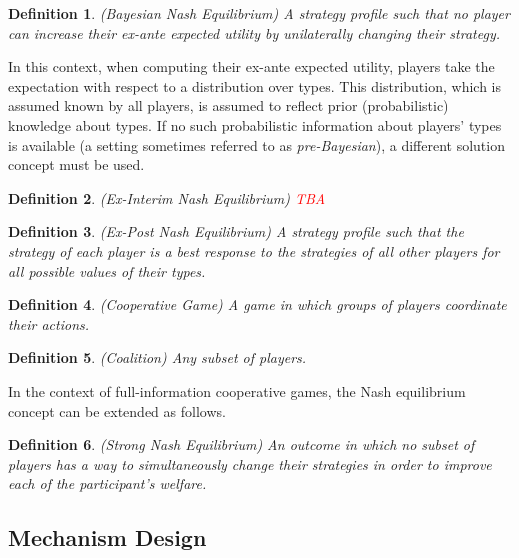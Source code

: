 \documentclass{article}
\newtheorem{definition}{Definition}
\begin{document}
\begin{definition}
(Bayesian Nash Equilibrium) A strategy profile such that no player can increase their ex-ante expected utility by unilaterally changing their strategy.
\end{definition}

In this context, when computing their ex-ante expected utility, players take the expectation with respect to a distribution over types. This distribution, which is assumed known by all players, is assumed to reflect prior (probabilistic) knowledge about types. If no such probabilistic information about players' types is available (a setting sometimes referred to as \textit{pre-Bayesian}), a different solution concept must be used. 


\begin{definition}
(Ex-Interim Nash Equilibrium) \textcolor{red}{TBA}
\end{definition}

\begin{definition}
(Ex-Post Nash Equilibrium) A strategy profile such that the strategy of each player is a best response to the strategies of all other players for all possible values of their types.
\end{definition}

\begin{definition}
(Cooperative Game) A game in which groups of players coordinate their actions.
\end{definition}

\begin{definition}
(Coalition) Any subset of players.
\end{definition}

In the context of full-information cooperative games, the Nash equilibrium concept can be extended as follows.

\begin{definition}
(Strong Nash Equilibrium) An outcome in which no subset of players has a way to simultaneously change their strategies in order to improve each of the participant's welfare.
\end{definition}

\subsection{Mechanism Design}
\end{document}

